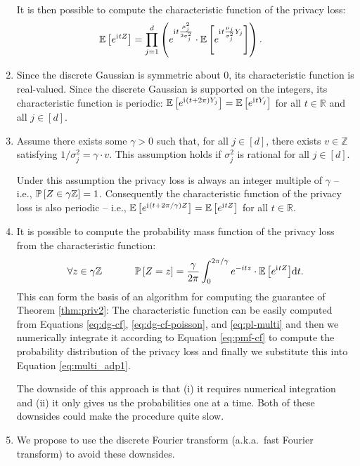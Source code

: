\documentclass{jpcfinal} %
\newcommand{\ii}{\mathrm{i}\mkern1mu}
\newcommand{\ex}[2]{{\ifx&#1& \mathbb{E} \else
\underset{#1}{\mathbb{E}} \fi \left[#2\right]}}
\newcommand{\pr}[2]{{\ifx&#1& \mathbb{P} \else
\underset{#1}{\mathbb{P}} \fi \left[#2\right]}}
\newcommand{\dx}[1][x]{\mathrm{d}#1}
\newcommand{\Z}{\mathbb{Z}}
\newcommand{\R}{\mathbb{R}}
\begin{document}
\begin{enumerate}
    It is then possible to compute the characteristic function of the privacy loss:
    \begin{align}
        \ex{}{e^{\ii{}tZ}} &= \prod_{j=1}^d \left( e^{\ii{}t \frac{\mu_j^2}{2\sigma_j^2}}\cdot \ex{}{e^{\ii{} t \frac{\mu_j}{\sigma_j^2} Y_j}} \right).\label{eq:pl-multi}
    \end{align}
    
    \item Since the discrete Gaussian is symmetric about $0$, its characteristic function is real-valued. Since the discrete Gaussian is supported on the integers, its characteristic function is periodic: $\ex{}{e^{\ii{}(t+2\pi)Y_j}} = \ex{}{e^{\ii{}tY_j}}$ for all $t \in \R$ and all $j \in [d]$.
    
    \item Assume there exists some $\gamma>0$ such that, for all $j \in [d]$, there exists $v \in \Z$ satisfying $1/\sigma_j^2 = \gamma \cdot v$. 
    This assumption holds if $\sigma_j^2$ is rational for all $j \in [d]$.
    
    Under this assumption the privacy loss is always an integer multiple of $\gamma$ -- i.e., $\pr{}{Z \in \gamma \Z}=1$.
    Consequently the characteristic function of the privacy loss is also periodic -- i.e., $\ex{}{e^{\ii{}(t+2\pi/\gamma)Z}} = \ex{}{e^{\ii{}tZ}}$ for all $t \in \R$.
    
    \item It is possible to compute the probability mass function of the privacy loss from the characteristic function:
    \begin{equation}
        \forall z \in \gamma \Z ~~~~~~~~~~ \pr{}{Z=z} = \frac{\gamma}{2\pi} \int_0^{2\pi/\gamma} e^{-itz} \cdot \ex{}{e^{\ii{}tZ}} \dx[t]. \label{eq:pmf-cf}
    \end{equation}
    This can form the basis of an algorithm for computing the guarantee of Theorem \ref{thm:priv2}: The characteristic function can be easily computed from Equations \ref{eq:dg-cf}, \ref{eq:dg-cf-poisson}, and \ref{eq:pl-multi} and then we numerically integrate it according to Equation \ref{eq:pmf-cf} to compute the probability distribution of the privacy loss and finally we substitute this into Equation \ref{eq:multi_adp1}.
    
    The downside of this approach is that (i) it requires numerical integration and (ii) it only gives us the probabilities one at a time. Both of these downsides could make the procedure quite slow.
    
    \item We propose to use the discrete Fourier transform (a.k.a.~fast Fourier transform) to avoid these downsides.
    

\end{enumerate}
\end{document}
